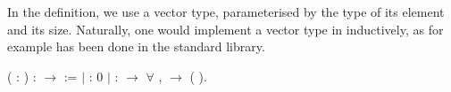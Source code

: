 In the  definition, we use a vector
type, parameterised by the type of its element and its size. Naturally, one
would implement a vector type in \Coq inductively, as for example has been
done in the standard library.
\begin{singlespace}
\begin{coqdoccode}
\coqdocnoindent
{} 
( : ) :
\ensuremath{\rightarrow}  :=\coqdoceol
\coqdocindent{1.00em}
\ensuremath{|}   :
  0\coqdoceol
\coqdocindent{1.00em}
\ensuremath{|}  :
 \ensuremath{\rightarrow} \ensuremath{\forall} ,
 
 \ensuremath{\rightarrow}
 
(
).\coqdoceol
\end{coqdoccode}
\end{singlespace}


